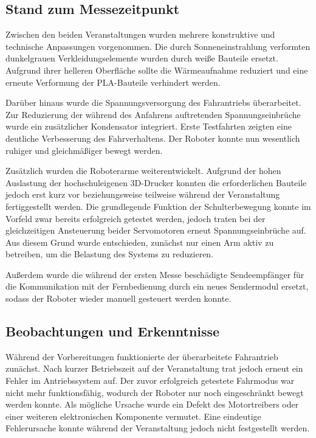 \subsection*{Stand zum Messezeitpunkt}

Zwischen den beiden Veranstaltungen wurden mehrere konstruktive und technische Anpassungen vorgenommen. Die durch Sonneneinstrahlung verformten dunkelgrauen Verkleidungselemente wurden durch weiße Bauteile ersetzt. Aufgrund ihrer helleren Oberfläche sollte die Wärmeaufnahme reduziert und eine erneute Verformung der PLA-Bauteile verhindert werden.

Darüber hinaus wurde die Spannungsversorgung des Fahrantriebs überarbeitet. Zur Reduzierung der während des Anfahrens auftretenden Spannungseinbrüche wurde ein zusätzlicher Kondensator integriert. Erste Testfahrten zeigten eine deutliche Verbesserung des Fahrverhaltens. Der Roboter konnte nun wesentlich ruhiger und gleichmäßiger bewegt werden.

Zusätzlich wurden die Roboterarme weiterentwickelt. Aufgrund der hohen Auslastung der hochschuleigenen 3D-Drucker konnten die erforderlichen Bauteile jedoch erst kurz vor beziehungsweise teilweise während der Veranstaltung fertiggestellt werden. Die grundlegende Funktion der Schulterbewegung konnte im Vorfeld zwar bereits erfolgreich getestet werden, jedoch traten bei der gleichzeitigen Ansteuerung beider Servomotoren erneut Spannungseinbrüche auf. Aus diesem Grund wurde entschieden, zunächst nur einen Arm aktiv zu betreiben, um die Belastung des Systems zu reduzieren.

Außerdem wurde die während der ersten Messe beschädigte Sendeempfänger für die Kommunikation mit der Fernbedienung durch ein neues Sendermodul ersetzt, sodass der Roboter wieder manuell gesteuert werden konnte.

\subsection*{Beobachtungen und Erkenntnisse}

Während der Vorbereitungen funktionierte der überarbeitete Fahrantrieb zunächst. Nach kurzer Betriebszeit auf der Veranstaltung trat jedoch erneut ein Fehler im Antriebssystem auf. Der zuvor erfolgreich getestete Fahrmodus war nicht mehr funktionsfähig, wodurch der Roboter nur noch eingeschränkt bewegt werden konnte. Als mögliche Ursache wurde ein Defekt des Motortreibers oder einer weiteren elektronischen Komponente vermutet. Eine eindeutige Fehlerursache konnte während der Veranstaltung jedoch nicht festgestellt werden.

